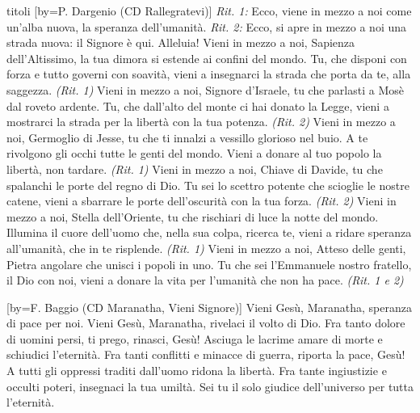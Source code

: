 \begin{songs}{titoli}
[by={P. Dargenio (CD Rallegratevi)}]
\beginchorus
\textit{Rit. 1:} Ecco, viene in mezzo a noi come un'alba nuova,
la speranza dell'umanità.
\textit{Rit. 2:} Ecco, si apre in mezzo a noi una strada nuova:
il Signore è qui. Alleluia!
\endchorus
\beginverse
Vieni in mezzo a noi, Sapienza dell'Altissimo,
la tua dimora si estende ai confini del mondo.
Tu, che disponi con forza e tutto governi con soavità,
vieni a insegnarci la strada che porta da te, alla saggezza. \textit{(Rit. 1)}
\endverse
\beginverse
Vieni in mezzo a noi, Signore d'Israele,
tu che parlasti a Mosè dal roveto ardente.
Tu, che dall'alto del monte ci hai donato la Legge,
vieni a mostrarci la strada per la libertà con la tua potenza. \textit{(Rit. 2)}
\endverse
\beginverse
Vieni in mezzo a noi, Germoglio di Jesse,
tu che ti innalzi a vessillo glorioso nel buio.
A te rivolgono gli occhi tutte le genti del mondo.
Vieni a donare al tuo popolo la libertà, non tardare. \textit{(Rit. 1)}
\endverse
\beginverse
Vieni in mezzo a noi, Chiave di Davide,
tu che spalanchi le porte del regno di Dio.
Tu sei lo scettro potente che scioglie le nostre catene,
vieni a sbarrare le porte dell'oscurità con la tua forza. \textit{(Rit. 2)}
\endverse
\beginverse
Vieni in mezzo a noi, Stella dell'Oriente,
tu che rischiari di luce la notte del mondo.
Illumina il cuore dell'uomo che, nella sua colpa, ricerca te,
vieni a ridare speranza all'umanità, che in te risplende. \textit{(Rit. 1)}
\endverse
\beginverse
Vieni in mezzo a noi, Atteso delle genti,
Pietra angolare che unisci i popoli in uno.
Tu che sei l'Emmanuele nostro fratello, il Dio con noi,
vieni a donare la vita per l'umanità che non ha pace. \textit{(Rit. 1 e 2)}
\endverse
\endsong

[by={F. Baggio (CD Maranatha, Vieni Signore)}]
\beginchorus
Vieni Gesù, Maranatha, speranza di pace per noi.
Vieni Gesù, Maranatha, rivelaci il volto di Dio.
\endchorus
\beginverse
Fra tanto dolore di uomini persi, ti prego, rinasci, Gesù!
Asciuga le lacrime amare di morte e schiudici l'eternità.
\endverse
\beginverse
Fra tanti conflitti e minacce di guerra, riporta la pace, Gesù!
A tutti gli oppressi traditi dall'uomo ridona la libertà.
\endverse
\beginverse
Fra tante ingiustizie e occulti poteri, insegnaci la tua umiltà.
Sei tu il solo giudice dell'universo per tutta l'eternità.
\endverse
\endsong

\end{songs}

